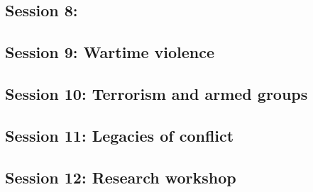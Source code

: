 \documentclass[12pt, a4paper]{article}
\begin{document}
\subsection*{Session 8: }

\subsection*{Session 9: Wartime violence}

\subsection*{Session 10: Terrorism and armed groups}

\subsection*{Session 11: Legacies of conflict}

\subsection*{Session 12: Research workshop}
\end{document}
